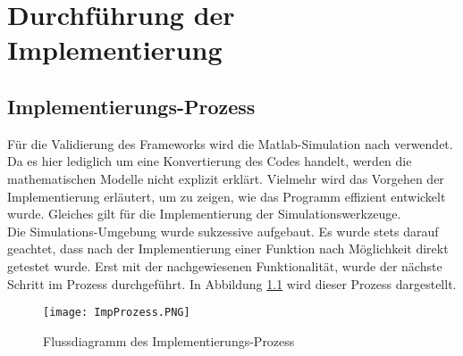 \chapter{Durchführung der Implementierung}
\section{Implementierungs-Prozess}
Für die Validierung des Frameworks wird die Matlab-Simulation nach \cite{Olucak.15.02.2017} verwendet. Da es hier lediglich um eine Konvertierung des Codes handelt, werden die mathematischen Modelle nicht explizit erklärt. Vielmehr wird das Vorgehen der Implementierung erläutert, um zu zeigen, wie das Programm effizient entwickelt wurde. Gleiches gilt für die Implementierung der Simulationswerkzeuge.\\
 Die Simulations-Umgebung wurde sukzessive aufgebaut. Es wurde stets darauf geachtet, dass nach der Implementierung einer Funktion nach Möglichkeit direkt getestet wurde. Erst mit der nachgewiesenen Funktionalität, wurde der nächste Schritt im Prozess durchgeführt. In Abbildung \ref{fig:ImpProzess} wird dieser Prozess dargestellt.
\begin{figure}[h]
	\texttt{[image: ImpProzess.PNG]}
	\label{fig:ImpProzess}
	\caption{Flussdiagramm des Implementierungs-Prozess}
\end{figure}
